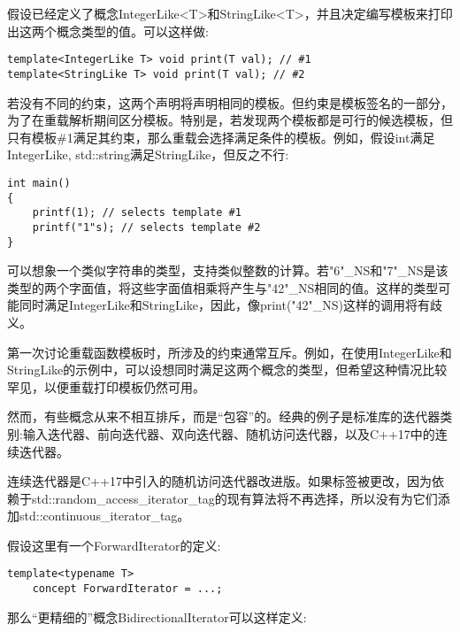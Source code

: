 
假设已经定义了概念IntegerLike<T>和StringLike<T>，并且决定编写模板来打印出这两个概念类型的值。可以这样做:

\begin{lstlisting}[style=styleCXX]
template<IntegerLike T> void print(T val); // #1
template<StringLike T> void print(T val); // #2
\end{lstlisting}

若没有不同的约束，这两个声明将声明相同的模板。但约束是模板签名的一部分，为了在重载解析期间区分模板。特别是，若发现两个模板都是可行的候选模板，但只有模板\#1满足其约束，那么重载会选择满足条件的模板。例如，假设int满足IntegerLike, std::string满足StringLike，但反之不行:

\begin{lstlisting}[style=styleCXX]
int main()
{
	printf(1); // selects template #1
	printf("1"s); // selects template #2
}
\end{lstlisting}

可以想象一个类似字符串的类型，支持类似整数的计算。若"6"\_NS和"7"\_NS是该类型的两个字面值，将这些字面值相乘将产生与"42"\_NS相同的值。这样的类型可能同时满足IntegerLike和StringLike，因此，像print("42"\_NS)这样的调用将有歧义。


第一次讨论重载函数模板时，所涉及的约束通常互斥。例如，在使用IntegerLike和StringLike的示例中，可以设想同时满足这两个概念的类型，但希望这种情况比较罕见，以便重载打印模板仍然可用。

然而，有些概念从来不相互排斥，而是“包容”的。经典的例子是标准库的迭代器类别:输入迭代器、前向迭代器、双向迭代器、随机访问迭代器，以及C++17中的连续迭代器。

\begin{tcolorbox}[colback=webgreen!5!white,colframe=webgreen!75!black]
\hspace*{0.75cm}连续迭代器是C++17中引入的随机访问迭代器改进版。如果标签被更改，因为依赖于std::random\_access\_iterator\_tag的现有算法将不再选择，所以没有为它们添加std::continuous\_iterator\_tag。
\end{tcolorbox}

假设这里有一个ForwardIterator的定义:

\begin{lstlisting}[style=styleCXX]
template<typename T>
	concept ForwardIterator = ...;
\end{lstlisting}

那么“更精细的”概念BidirectionalIterator可以这样定义:

